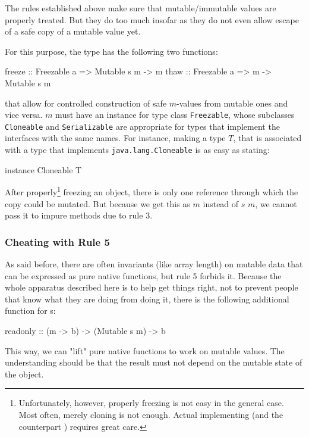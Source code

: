 The rules established above make sure that mutable/immutable values are properly treated. But they do too much insofar as they do not even allow escape of a safe copy of a mutable value yet.

For this purpose, the  type has the following two functions:

\begin{code}
freeze :: Freezable a => Mutable s m -> m
thaw   :: Freezable a => m -> Mutable s m
\end{code}

that allow for controlled construction of safe $m$-values from mutable ones and vice versa. $m$ must have an instance for type class \texttt{Freezable}, whose subclasses \texttt{Cloneable} and \texttt{Serializable} are appropriate for \java{} types that implement the \java{} interfaces with the same names. For instance, making a type $T$, that is associated with a \java{} type that implements \texttt{java.lang.Cloneable} is as easy as stating:

\begin{code}
instance Cloneable T
\end{code}

After properly\footnote{
Unfortunately, however, properly freezing is not easy in the general case. Most often, merely cloning is not enough. Actual implementing  (and the counterpart ) requires great care.}
freezing an object, there is only one reference through which the copy could be mutated. But because we get this as $m$ instead of  $s$ $m$, we cannot pass it to impure methods due to rule 3.

\subsubsection{Cheating with Rule 5}

As said before, there are often invariants (like array length) on mutable data that can be expressed as pure native functions, but rule 5 forbids it. Because the whole apparatus described here is to help get things right, not to prevent people that know what they are doing from doing it, there is the following additional function for s:

\begin{code}
readonly :: (m -> b) -> (Mutable s m) -> b
\end{code}

This way, we can "lift" pure native functions to work on mutable values. The understanding should be that the result must not depend on the mutable state of the object.

